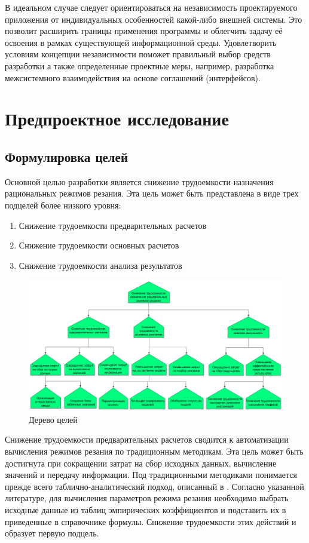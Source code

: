 \documentclass[14pt,oneside,final]{extreport}
\begin{document}
	В идеальном случае следует ориентироваться на независимость проектируемого приложения от индивидуальных особенностей какой-либо внешней системы. Это позволит расширить границы применения программы и облегчить задачу её освоения в рамках существующей информационной среды. Удовлетворить условиям концепции независимости поможет правильный выбор средств разработки а также определенные проектные меры, например, разработка межсистемного взаимодействия на основе соглашений (интерфейсов). 
	
	\chapter{Предпроектное исследование}
	\section{Формулировка целей}
	Основной целью разработки является снижение трудоемкости назначения рациональных режимов резания. Эта цель может быть представлена в виде трех подцелей более низкого уровня: 
	\begin{enumerate}
	\item Снижение трудоемкости предварительных расчетов
	\item Снижение трудоемкости основных расчетов
	\item Снижение трудоемкости анализа результатов 
	\end{enumerate}
	\begin{figure}[!h]
	\begin{center}
	\includegraphics[scale=0.55]{img/at} 
	\end{center}
	\caption{Дерево целей}
	\label{fig:aim-tree}
	\end{figure}
	
	Снижение трудоемкости предварительных расчетов сводится к автоматизации вычисления режимов резания по традиционным методикам. Эта цель может быть достигнута при сокращении затрат на сбор исходных данных, вычисление значений и передачу информации. Под традиционными методиками понимается прежде всего таблично-аналитический подход, описанный в \cite{book:Kosilova}. Согласно указанной литературе, для вычисления параметров режима резания необходимо выбрать исходные данные из таблиц эмпирических коэффициентов и подставить их в приведенные в справочнике формулы. Снижение трудоемкости этих действий и образует первую подцель.
	
\end{document}
